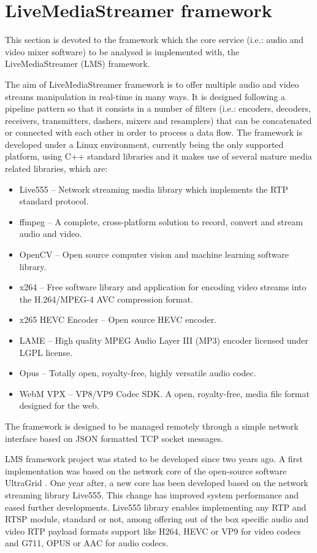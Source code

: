 \section{LiveMediaStreamer framework}\label{SOA:LMS}

This section is devoted to the framework which the core service (i.e.: audio and video mixer software) to be analysed is implemented with, the LiveMediaStreamer (LMS) framework. 

The aim of LiveMediaStreamer framework is to offer multiple audio and video streams manipulation in real-time in many ways. It is designed following a pipeline pattern so that it consists in a number of filters (i.e.: encoders, decoders, receivers, transmitters, dashers, mixers and resamplers) that can be concatenated or connected with each other in order to process a data flow. The framework is developed under a Linux environment, currently being the only supported platform, using C++ standard libraries and it makes use of several mature media related libraries, which are: 

\begin{itemize}
\item Live555 \cite{l555} – Network streaming media library which implements the RTP standard protocol.
\item ffmpeg \cite{ffmpeg} – A complete, cross-platform solution to record, convert and stream audio and video.
\item OpenCV \cite{opencv} – Open source computer vision and machine learning software library.
\item x264 \cite{x264} – Free software library and application for encoding video streams into the H.264/MPEG-4 AVC compression format.
\item x265 HEVC Encoder \cite{x265} – Open source HEVC encoder.
\item LAME \cite{lame} – High quality MPEG Audio Layer III (MP3) encoder licensed under LGPL license.
\item Opus \cite{opus} – Totally open, royalty-free, highly versatile audio codec.
\item WebM VPX \cite{webm} – VP8/VP9 Codec SDK. A open, royalty-free, media file format designed for the web.
\end{itemize}
 
The framework is designed to be managed remotely through a simple network interface based on JSON formatted TCP socket messages. 

LMS framework project was stated to be developed since two years ago. A first implementation was based on the network core of the open-source software UltraGrid \cite{ug}. One year after, a new core has been developed based on the network streaming library Live555. This change has improved system performance and eased further developments. Live555 library enables implementing any RTP and RTSP module, standard or not, among offering out of the box specific audio and video RTP payload formats support like H264, HEVC or VP9 for video codecs and G711, OPUS or AAC for audio codecs.


